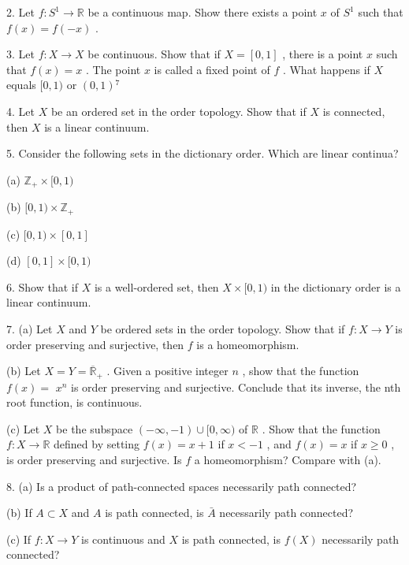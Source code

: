 2. Let \(f : {S}^{1} \rightarrow  \mathbb{R}\) be a continuous map. Show there exists a point \(x\) of \({S}^{1}\) such that \(f\left( x\right)  = f\left( {-x}\right)\) .

3. Let \(f : X \rightarrow  X\) be continuous. Show that if \(X = \left\lbrack  {0,1}\right\rbrack\) , there is a point \(x\) such that \(f\left( x\right)  = x\) . The point \(x\) is called a fixed point of \(f\) . What happens if \(X\) equals \(\lbrack 0,1)\) or \(\left( {0,1}\right) {}^{7}\)

4. Let \(X\) be an ordered set in the order topology. Show that if \(X\) is connected, then \(X\) is a linear continuum.

5. Consider the following sets in the dictionary order. Which are linear continua?

(a) \({\mathbb{Z}}_{ + } \times  \lbrack 0,1)\)

(b) \(\lbrack 0,1) \times  {\mathbb{Z}}_{ + }\)

(c) \(\lbrack 0,1) \times  \left\lbrack  {0,1}\right\rbrack\)

(d) \(\left\lbrack  {0,1}\right\rbrack   \times  \lbrack 0,1)\)

6. Show that if \(X\) is a well-ordered set, then \(X \times  \lbrack 0,1)\) in the dictionary order is a linear continuum.

7. (a) Let \(X\) and \(Y\) be ordered sets in the order topology. Show that if \(f : X \rightarrow  Y\) is order preserving and surjective, then \(f\) is a homeomorphism.

(b) Let \(X = Y = {\overline{\mathbb{R}}}_{ + }\) . Given a positive integer \(n\) , show that the function \(f\left( x\right)  =\)  \({x}^{n}\) is order preserving and surjective. Conclude that its inverse, the nth root function, is continuous.

(c) Let \(X\) be the subspace \(\left( {-\infty , - 1}\right)  \cup  \lbrack 0,\infty )\) of \(\mathbb{R}\) . Show that the function \(f : X \rightarrow  \mathbb{R}\) defined by setting \(f\left( x\right)  = x + 1\) if \(x <  - 1\) , and \(f\left( x\right)  = x\) if \(x \geq  0\) , is order preserving and surjective. Is \(f\) a homeomorphism? Compare with (a).

8. (a) Is a product of path-connected spaces necessarily path connected?

(b) If \(A \subset  X\) and \(A\) is path connected, is \(\bar{A}\) necessarily path connected?

(c) If \(f : X \rightarrow  Y\) is continuous and \(X\) is path connected, is \(f\left( X\right)\) necessarily path connected?

